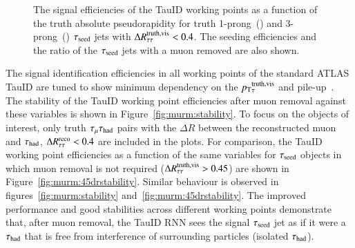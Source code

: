         \begin{figure}[hbtp]
            \begin{center}
                \caption{The signal efficiencies of the TauID working points as a function of the truth absolute pseudorapidity 
                for truth 1-prong~(\protect{}) and 3-prong~(\protect{}) $\tau_\mathrm{seed}$ jets
                with $\Delta R^\mathrm{truth, vis}_\mathrm{\tau\tau} < 0.4$. The seeding efficiencies and the ratio of the 
                $\tau_\mathrm{seed}$ jets with a muon removed are also shown.}
                \label{fig:murm:etaRM}
            \end{center}
        \end{figure}

        The signal identification efficiencies in all working points of the standard ATLAS TauID are tuned to show minimum 
        dependency on the $p_{\text{T}}{}_{\tau}^\mathrm{truth,vis}$ and pile-up~\cite{ATL-PHYS-PUB-2019-033}. The stability 
        of the TauID working point efficiencies after muon removal against these variables is shown in Figure~\ref{fig:murm:stability}. 
        To focus on the objects of interest, only truth $\tau_\mathrm{\mu}\tau_\mathrm{had}$ pairs with the $\Delta R$ between the reconstructed muon and $\tau_{\text{had}}$, $\Delta R^\mathrm{reco}_\mathrm{\tau\tau} < 0.4$ 
        are included in the plots. For comparison, the TauID working point efficiencies as a function of the same variables 
        for $\tau_\mathrm{seed}$ objects in which muon removal is not required ($\Delta R^\mathrm{truth, vis}_\mathrm{\tau\tau} > 0.45$) 
        are shown in Figure~\ref{fig:murm:45drstability}. Similar behaviour is observed in figures~\ref{fig:murm:stability} and~\ref{fig:murm:45drstability}. 
        The improved performance and good stabilities across different working points demonstrate that, after muon removal, 
        the TauID RNN sees the signal $\tau_\mathrm{seed}$ jet as if it were a $\tau_{\text{had}}$ that is free from interference of surrounding particles (isolated $\tau_{\text{had}}$).

